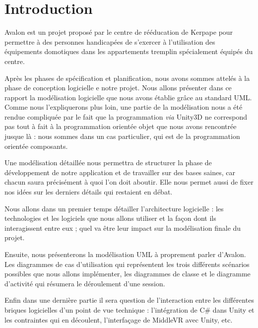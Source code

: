 \section{Introduction}
Avalon est un projet proposé par le centre de rééducation de Kerpape pour permettre à des personnes handicapées de s'exercer à l'utilisation des équipements domotiques dans les appartements tremplin spécialement équipés du centre.

Après les phases de spécification et planification, nous avons sommes attelés à la phase de conception logicielle e notre projet. Nous allons présenter dans ce rapport la modélisation logicielle que nous avons établie grâce au standard UML. Comme nous l'expliquerons plus loin, une partie de la modélisation nous a été rendue compliquée par le fait que la programmation \textit{via} Unity3D ne correspond pas tout à fait à la programmation orientée objet que nous avons rencontrée jusque là : nous sommes dans un cas particulier, qui est de la programmation orientée composants. 

Une modélisation détaillée nous permettra de structurer la phase de développement de notre application et de travailler sur des bases saines, car chacun saura précisément à quoi l'on doit aboutir. Elle nous permet aussi de fixer nos idées sur les derniers détails qui restaient en débat. 

Nous allons dans un premier temps détailler l'architecture logicielle : les technologies et les logiciels que nous allons utiliser et la façon dont ils interagissent entre eux ; quel va être leur impact sur la modélisation finale du projet. 

Ensuite, nous présenterons la modélisation UML à proprement parler d'Avalon. Les diagrammes de cas d'utilisation qui représentent les trois différents scénarios possibles que nous allons implémenter, les diagrammes de classe et le diagramme d'activité qui résumera le déroulement d'une session.

Enfin dans une dernière partie il sera question de l'interaction entre les différentes briques logicielles d'un point de vue technique : l'intégration de C\# dans Unity et les contraintes qui en découlent, l'interfaçage de MiddleVR avec Unity, etc. 